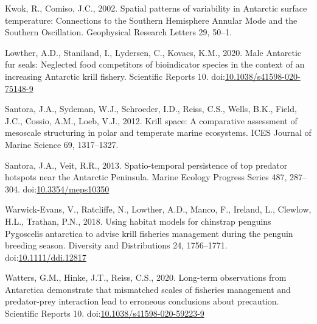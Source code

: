 \documentclass[]{elsarticle} %
\begin{document}
\leavevmode\hypertarget{ref-kwokSpatialPatternsVariability2002}{}%
Kwok, R., Comiso, J.C., 2002. Spatial patterns of variability in
Antarctic surface temperature: Connections to the Southern Hemisphere
Annular Mode and the Southern Oscillation. Geophysical Research Letters
29, 50--1.

\leavevmode\hypertarget{ref-Lowther2020}{}%
Lowther, A.D., Staniland, I., Lydersen, C., Kovacs, K.M., 2020. Male
Antarctic fur seals: Neglected food competitors of bioindicator species
in the context of an increasing Antarctic krill fishery. Scientific
Reports 10.
doi:\href{https://doi.org/10.1038/s41598-020-75148-9}{10.1038/s41598-020-75148-9}

\leavevmode\hypertarget{ref-santoraKrillSpaceComparative2012}{}%
Santora, J.A., Sydeman, W.J., Schroeder, I.D., Reiss, C.S., Wells, B.K.,
Field, J.C., Cossio, A.M., Loeb, V.J., 2012. Krill space: A comparative
assessment of mesoscale structuring in polar and temperate marine
ecosystems. ICES Journal of Marine Science 69, 1317--1327.

\leavevmode\hypertarget{ref-Santora2013}{}%
Santora, J.A., Veit, R.R., 2013. Spatio-temporal persistence of top
predator hotspots near the Antarctic Peninsula. Marine Ecology Progress
Series 487, 287--304.
doi:\href{https://doi.org/10.3354/meps10350}{10.3354/meps10350}

\leavevmode\hypertarget{ref-Warwick-Evans2018}{}%
Warwick-Evans, V., Ratcliffe, N., Lowther, A.D., Manco, F., Ireland, L.,
Clewlow, H.L., Trathan, P.N., 2018. Using habitat models for chinstrap
penguins Pygoscelis antarctica to advise krill fisheries management
during the penguin breeding season. Diversity and Distributions 24,
1756--1771.
doi:\href{https://doi.org/10.1111/ddi.12817}{10.1111/ddi.12817}

\leavevmode\hypertarget{ref-Watters2020}{}%
Watters, G.M., Hinke, J.T., Reiss, C.S., 2020. Long-term observations
from Antarctica demonstrate that mismatched scales of fisheries
management and predator-prey interaction lead to erroneous conclusions
about precaution. Scientific Reports 10.
doi:\href{https://doi.org/10.1038/s41598-020-59223-9}{10.1038/s41598-020-59223-9}
\end{document}
